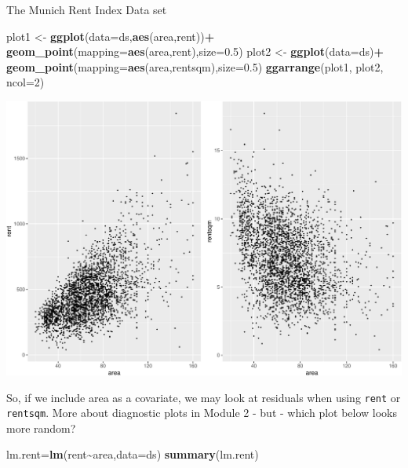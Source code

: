 \documentclass[
  ignorenonframetext,
]{beamer}
\newenvironment{Shaded}{\begin{snugshade}}{\end{snugshade}}
\newcommand{\AttributeTok}[1]{\textcolor[rgb]{0.13,0.29,0.53}{#1}}
\newcommand{\DecValTok}[1]{\textcolor[rgb]{0.00,0.00,0.81}{#1}}
\newcommand{\FloatTok}[1]{\textcolor[rgb]{0.00,0.00,0.81}{#1}}
\newcommand{\FunctionTok}[1]{\textcolor[rgb]{0.13,0.29,0.53}{\textbf{#1}}}
\newcommand{\NormalTok}[1]{#1}
\newcommand{\OtherTok}[1]{\textcolor[rgb]{0.56,0.35,0.01}{#1}}
\newcommand{\SpecialCharTok}[1]{\textcolor[rgb]{0.81,0.36,0.00}{\textbf{#1}}}
\begin{document}
\begin{frame}[fragile]
\begin{block}{The Munich Rent Index Data set}
\begin{Shaded}
\begin{Highlighting}[]
\NormalTok{plot1 }\OtherTok{\textless{}{-}} \FunctionTok{ggplot}\NormalTok{(}\AttributeTok{data=}\NormalTok{ds,}\FunctionTok{aes}\NormalTok{(area,rent))}\SpecialCharTok{+}
  \FunctionTok{geom\_point}\NormalTok{(}\AttributeTok{mapping=}\FunctionTok{aes}\NormalTok{(area,rent),}\AttributeTok{size=}\FloatTok{0.5}\NormalTok{)}
\NormalTok{plot2 }\OtherTok{\textless{}{-}} \FunctionTok{ggplot}\NormalTok{(}\AttributeTok{data=}\NormalTok{ds)}\SpecialCharTok{+}
  \FunctionTok{geom\_point}\NormalTok{(}\AttributeTok{mapping=}\FunctionTok{aes}\NormalTok{(area,rentsqm),}\AttributeTok{size=}\FloatTok{0.5}\NormalTok{)}
\FunctionTok{ggarrange}\NormalTok{(plot1, plot2, }\AttributeTok{ncol=}\DecValTok{2}\NormalTok{)}
\end{Highlighting}
\end{Shaded}

\includegraphics{Module01IntroPresentation_files/figure-beamer/unnamed-chunk-6-1.pdf}

So, if we include area as a covariate, we may look at residuals when
using \texttt{rent} or \texttt{rentsqm}. More about diagnostic plots in
Module 2 - but - which plot below looks more random?

\begin{Shaded}
\begin{Highlighting}[]
\NormalTok{lm.rent}\OtherTok{=}\FunctionTok{lm}\NormalTok{(rent}\SpecialCharTok{\textasciitilde{}}\NormalTok{area,}\AttributeTok{data=}\NormalTok{ds)}
\FunctionTok{summary}\NormalTok{(lm.rent)}
\end{Highlighting}
\end{Shaded}


\end{block}
\end{frame}
\end{document}
